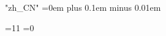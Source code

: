     \XeTeXlinebreaklocale "zh_CN"
    \XeTeXlinebreakskip=0em plus 0.1em minus 0.01em

    {=11
    \gdef\zhs@savefont{\edef\zhs@savedfont{\the\font}}%
    \gdef\zhs@restorefont{\zhs@savedfont}%
    \gdef\zhs@skipsp@ces{%
      \ifcat a\noexpand\zhs@tmpchar %
        \zhs@testskipenzh
      \else
        \ifcat !\noexpand\zhs@tmpchar %
          \zhs@testskipenzh
        \else
          \ifcat $\noexpand\zhs@tmpchar %
            \skipenzh\relax
          \else
            \skipenzh\relax
          \fi
        \fi
      \fi
    }=0 }

    \ifx\XeTeXgenerateactualtext\thisisundefined
    \else
    \fi

  \fi %

  \iftxinativeunicodecapable


    \let\alphabeticrm\rm
    \gdef\rm{\alphabeticrm\tenmc}

    \let\alphabeticit\it
    \gdef\it{\alphabeticit\tenmc}

    \let\alphabeticsl\sl
    \gdef\sl{\alphabeticsl\tengt}

    \let\alphabeticbf\bf
    \gdef\bf{\alphabeticbf\tengt}

